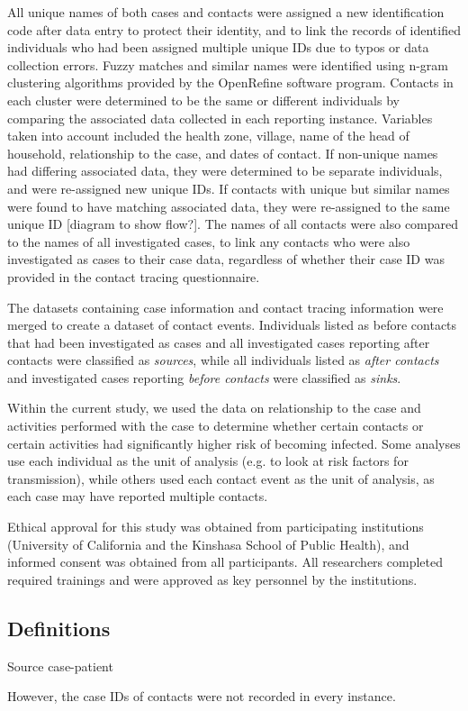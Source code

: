 All unique names of both cases and contacts were assigned a new identification code after data entry to protect their identity, and to link the records of identified individuals who had been assigned multiple unique IDs due to typos or data collection errors. Fuzzy matches and similar names were identified using n-gram clustering algorithms provided by the OpenRefine software program. Contacts in each cluster were determined to be the same or different individuals by comparing the associated data collected in each reporting instance. Variables taken into account included the health zone, village, name of the head of household, relationship to the case, and dates of contact. If non-unique names had differing associated data, they were determined to be separate individuals, and were re-assigned new unique IDs. If contacts with unique but similar names were found to have matching associated data, they were re-assigned to the same unique ID [diagram to show flow?]. The names of all contacts were also compared to the names of all investigated cases, to link any contacts who were also investigated as cases to their case data, regardless of whether their case ID was provided in the contact tracing questionnaire. 

The datasets containing case information and contact tracing information were merged to create a dataset of contact events. Individuals listed as before contacts that had been investigated as cases and all investigated cases reporting after contacts were classified as \textit{sources}, while all individuals listed as \textit{after contacts} and investigated cases reporting \textit{before contacts} were classified as \textit{sinks}.



Within the current study, we used the data on relationship to the case and activities performed with the case to determine whether certain contacts or certain activities had significantly higher risk of becoming infected. 
Some analyses use each individual as the unit of analysis (e.g. to look at risk factors for transmission), while others used each contact event as the unit of analysis, as each case may have reported multiple contacts. 

Ethical approval for this study was obtained from participating institutions (University of California and the Kinshasa School of Public Health), and informed consent was obtained from all participants. All researchers completed required trainings and were approved as key personnel by the institutions. 

\subsection{Definitions}
Source case-patient \cite{Dixon2015}

However, the case IDs of contacts were not recorded in every instance.




